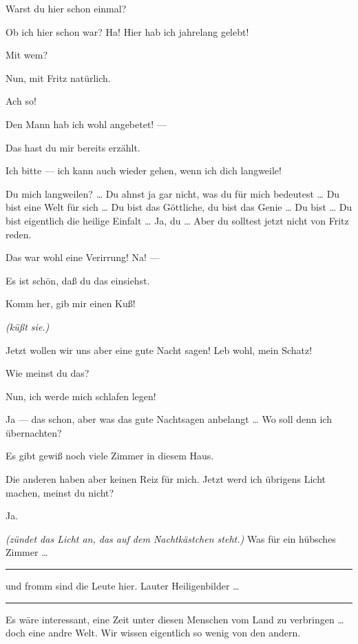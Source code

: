 \documentclass[
	final,
	a4paper,
	ngerman,
	mpinclude = true, %
	twoside = true,
	open = right,
	cleardoublepage = plain,
	DIV = 13,
	BCOR = 1cm,
	titlepage = firstiscover,
	]{scrbook}
\newcommand{\direction}[1]{\textit{(#1)}}
\newenvironment{deletion}{%
		\vspace{0.25\baselineskip}
		\hrule
		\vspace{0.25\baselineskip}
		\color{darkgray}
	}{
		\color{black}
		\vspace{0.25\baselineskip}
		\hrule 
		\vspace{0.25\baselineskip}
	}
\newcommand{\thecharacter}[1]{\textup{\textsc{#1}}\xspace}
\newcommand{\thedichter}{\thecharacter{Robert Bibitz}}
\newcommand{\theschauspielerin}{\thecharacter{Daniela}}
\newcommand{\character}[1]{\item[#1:]}
\newcommand{\dichter}{\character{\thedichter}}
\newcommand{\schauspielerin}{\character{\theschauspielerin}}
\begin{document}
\begin{play}
	\dichter
	Warst du hier schon einmal?

	\schauspielerin
	Ob ich hier schon war? Ha! Hier hab ich jahrelang gelebt!

	\dichter
	Mit wem?

	\schauspielerin
	Nun, mit Fritz natürlich.

	\dichter
	Ach so!

	\schauspielerin
	Den Mann hab ich wohl angebetet! ---

	\dichter
	Das hast du mir bereits erzählt.

	\schauspielerin
	Ich bitte --- ich kann auch wieder gehen, wenn ich dich langweile!

	\dichter
	Du mich langweilen? \ldots{} Du ahnst ja gar nicht, was du für mich bedeutest \ldots{} Du bist eine Welt für sich \ldots{} Du bist das Göttliche, du bist das Genie \ldots{} Du bist \ldots{} Du bist eigentlich die heilige Einfalt \ldots{} Ja, du \ldots{} Aber du solltest jetzt nicht von Fritz reden.

	\schauspielerin
	Das war wohl eine Verirrung! Na! ---

	\dichter
	Es ist schön, daß du das einsiehst.

	\schauspielerin
	Komm her, gib mir einen Kuß!

	\dichter
	\direction{küßt sie.}

	\schauspielerin
	Jetzt wollen wir uns aber eine gute Nacht sagen! Leb wohl, mein Schatz!

	\dichter
	Wie meinst du das?

	\schauspielerin
	Nun, ich werde mich schlafen legen!

	\dichter
	Ja --- das schon, aber was das gute Nachtsagen anbelangt \ldots{} Wo soll denn ich übernachten?

	\schauspielerin
	Es gibt gewiß noch viele Zimmer in diesem Haus.

	\dichter
	Die anderen haben aber keinen Reiz für mich. Jetzt werd ich übrigens Licht machen, meinst du nicht?

	\schauspielerin
	Ja.

	\dichter
	\direction{zündet das Licht an, das auf dem Nachtkästchen steht.} Was für ein hübsches Zimmer \ldots{}
	\begin{deletion}
		und fromm sind die Leute hier. Lauter Heiligenbilder \ldots{}
	\end{deletion}
	Es wäre interessant, eine Zeit unter diesen Menschen vom Land zu verbringen \ldots{} doch eine andre Welt. Wir wissen eigentlich so wenig von den andern.


\end{play}
\end{document}
